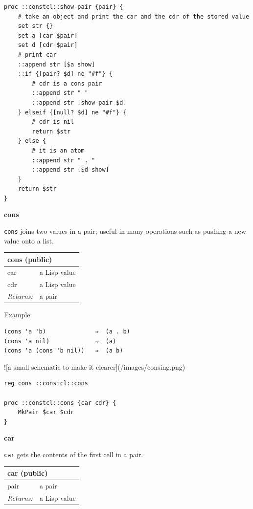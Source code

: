 \documentclass[twoside,9pt]{report}
\begin{document}
\noindent\makebox[\linewidth]{\rule{\linewidth}{0.4pt}}
\begin{lstlisting}
proc ::constcl::show-pair {pair} {
    # take an object and print the car and the cdr of the stored value
    set str {}
    set a [car $pair]
    set d [cdr $pair]
    # print car
    ::append str [$a show]
    ::if {[pair? $d] ne "#f"} {
        # cdr is a cons pair
        ::append str " "
        ::append str [show-pair $d]
    } elseif {[null? $d] ne "#f"} {
        # cdr is nil
        return $str
    } else {
        # it is an atom
        ::append str " . "
        ::append str [$d show]
    }
    return $str
}
\end{lstlisting}
\noindent\makebox[\linewidth]{\rule{\linewidth}{0.4pt}}

\textbf{cons}


\texttt{cons} joins two values in a pair; useful in many operations such as pushing a new value onto a list.

\begin{tabular}{ |l l| }
\hline
\multicolumn{2}{|l|}{cons (public)} \\
\hline
car & a Lisp value \\
cdr & a Lisp value \\
\textit{Returns:} & a pair \\
\hline
\end{tabular}


Example:

\noindent\makebox[\linewidth]{\rule{\linewidth}{0.4pt}}
\begin{lstlisting}
(cons 'a 'b)              ⇒  (a . b)
(cons 'a nil)             ⇒  (a)
(cons 'a (cons 'b nil))   ⇒  (a b)
\end{lstlisting}
\noindent\makebox[\linewidth]{\rule{\linewidth}{0.4pt}}

![a small schematic to make it clearer](/images/consing.png)

\noindent\makebox[\linewidth]{\rule{\linewidth}{0.4pt}}
\begin{lstlisting}
reg cons ::constcl::cons
 
proc ::constcl::cons {car cdr} {
    MkPair $car $cdr
}
\end{lstlisting}
\noindent\makebox[\linewidth]{\rule{\linewidth}{0.4pt}}

\textbf{car}


\texttt{car} gets the contents of the first cell in a pair.

\begin{tabular}{ |l l| }
\hline
\multicolumn{2}{|l|}{car (public)} \\
\hline
pair & a pair \\
\textit{Returns:} & a Lisp value \\
\hline
\end{tabular}
\end{document}
